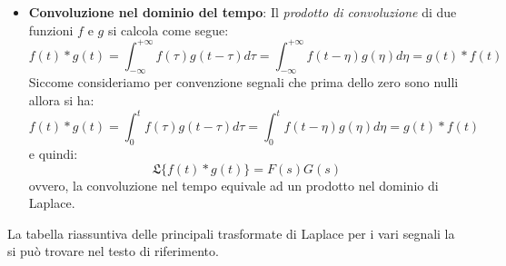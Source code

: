 \documentclass[a4paper]{report}
\begin{document}
\begin{itemize}
{\begin{equation}\label{eq:lapintt}
  \mathfrak{L} \left\{ \int_{0}^{t} f(\tau)d\tau \right\} = \frac{1}{s}F(s)
\end{equation}
ovvero $\frac{1}{s}$ \`e l'\emph{operatore di integrazione}.
}
\item{\textbf{Convoluzione nel dominio del tempo}: Il \emph{prodotto
    di convoluzione} di due funzioni $f$ e $g$ si calcola come segue: 
\begin{displaymath}
  f(t)\ast g(t)=\int_{-\infty}^{+\infty}f(\tau)g(t-\tau)d\tau =
  \int_{-\infty}^{+\infty}f(t-\eta)g(\eta)d\eta = g(t)\ast f(t)
\end{displaymath}
Siccome consideriamo per convenzione segnali che prima dello zero sono
nulli allora si ha: 
\begin{displaymath}
  f(t)\ast g(t) =
  \int_{0}^{t}f(\tau)g(t-\tau)d\tau=\int_{0}^{t}f(t-\eta)g(\eta)d\eta
  = g(t)\ast f(t)
\end{displaymath}
e quindi:
\begin{equation}\label{eq:lapconvt}
  \mathfrak{L}\{f(t)\ast g(t)\} = F(s)G(s)
\end{equation}
ovvero, la convoluzione nel tempo equivale ad un prodotto nel dominio di Laplace.
}
\end{itemize}
La tabella riassuntiva delle principali trasformate di Laplace per i
vari segnali la si pu\`o trovare nel testo di
riferimento. \cite{FCAlaptab}
\end{document}

